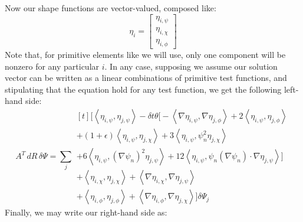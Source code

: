 \documentclass[reqno]{article}
\begin{document}
Now our shape functions are vector-valued, composed like:
\begin{equation}
    \eta_i
    =
    \begin{bmatrix}
        \eta_{i, \psi} \\
        \eta_{i, \chi} \\
        \eta_{i, \phi}
    \end{bmatrix}
\end{equation}
Note that, for primitive elements like we will use, only one component will be nonzero for any particular $i$.
In any case, supposing we assume our solution vector can be written as a linear combinations of primitive test functions, and stipulating that the equation hold for any test function, we get the following left-hand side:
\begin{equation}
    A^T \, dR \, \delta \Psi
    =
    \sum_{j}
    \begin{multlined}[t]
    \Biggl[
        \left<\eta_{i, \psi}, \eta_{j, \psi} \right>
        - \delta t \theta \bigl[ -\left< \nabla \eta_{i, \psi}, \nabla \eta_{j, \phi} \right>
            + 2 \left< \eta_{i, \psi}, \eta_{j, \phi} \right> \\
            + \left(1 + \epsilon\right) \left< \eta_{i, \psi}, \eta_{j, \chi} \right>
            + 3 \left< \eta_{i, \psi}, \psi_n^2 \eta_{j, \chi} \right> \\
            + 6 \left<\eta_{i, \psi}, \left(\nabla \psi_n\right)^2 \eta_{j, \psi} \right>
            + 12 \left< \eta_{i, \psi}, \psi_n \left(\nabla \psi_n \right) \cdot \nabla \eta_{j, \psi} \right>
        \bigr] \\
        + \left< \eta_{i, \chi}, \eta_{j, \chi} \right>
        + \left< \nabla \eta_{i, \chi}, \nabla \eta_{j, \psi} \right> \\
        + \left< \eta_{i, \phi}, \eta_{j, \phi} \right>
        + \left< \nabla \eta_{i, \phi}, \nabla \eta_{j, \chi} \right>
    \Biggr]
    \delta \Psi_j
    \end{multlined}
\end{equation}
Finally, we may write our right-hand side as:
\end{document}
